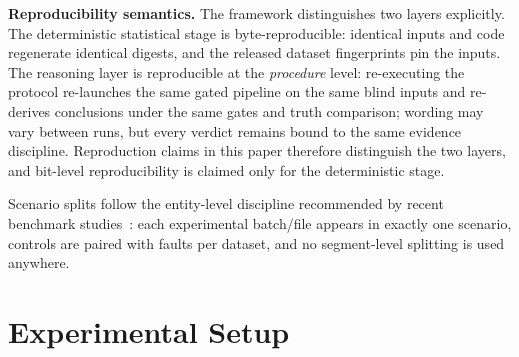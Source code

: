 \documentclass[preprint,12pt]{elsarticle}
\begin{document}
\textbf{Reproducibility semantics.} The framework distinguishes two layers explicitly. The deterministic statistical stage is byte-reproducible: identical inputs and code regenerate identical digests, and the released dataset fingerprints pin the inputs. The reasoning layer is reproducible at the \emph{procedure} level: re-executing the protocol re-launches the same gated pipeline on the same blind inputs and re-derives conclusions under the same gates and truth comparison; wording may vary between runs, but every verdict remains bound to the same evidence discipline. Reproduction claims in this paper therefore distinguish the two layers, and bit-level reproducibility is claimed only for the deterministic stage.

Scenario splits follow the entity-level discipline recommended by recent benchmark studies~\cite{vieira2026towards,hendriks2022towards}: each experimental batch/file appears in exactly one scenario, controls are paired with faults per dataset, and no segment-level splitting is used anywhere.

\section{Experimental Setup}
\label{sec:setup}
\end{document}
